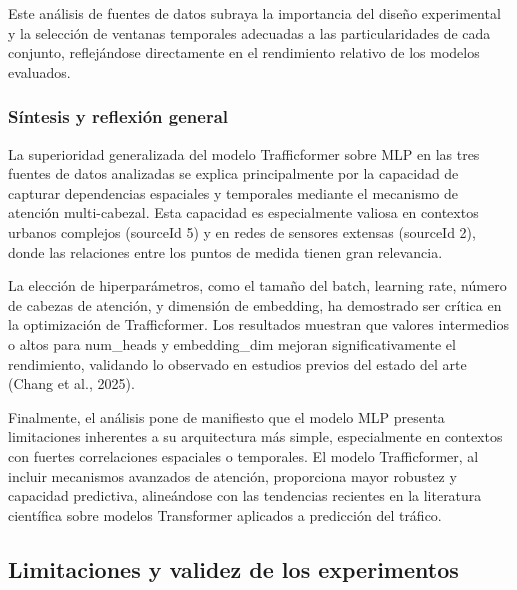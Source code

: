 Este análisis de fuentes de datos subraya la importancia del diseño experimental y la selección de ventanas temporales adecuadas a las particularidades de cada conjunto, reflejándose directamente en el rendimiento relativo de los modelos evaluados.

\subsubsection{Síntesis y reflexión general}

La superioridad generalizada del modelo Trafficformer sobre MLP en las tres fuentes de datos analizadas se explica principalmente por la capacidad de capturar dependencias espaciales y temporales mediante el mecanismo de atención multi-cabezal. Esta capacidad es especialmente valiosa en contextos urbanos complejos (sourceId 5) y en redes de sensores extensas (sourceId 2), donde las relaciones entre los puntos de medida tienen gran relevancia.

La elección de hiperparámetros, como el tamaño del batch, learning rate, número de cabezas de atención, y dimensión de embedding, ha demostrado ser crítica en la optimización de Trafficformer. Los resultados muestran que valores intermedios o altos para num_heads y embedding_dim mejoran significativamente el rendimiento, validando lo observado en estudios previos del estado del arte (Chang et al., 2025).

Finalmente, el análisis pone de manifiesto que el modelo MLP presenta limitaciones inherentes a su arquitectura más simple, especialmente en contextos con fuertes correlaciones espaciales o temporales. El modelo Trafficformer, al incluir mecanismos avanzados de atención, proporciona mayor robustez y capacidad predictiva, alineándose con las tendencias recientes en la literatura científica sobre modelos Transformer aplicados a predicción del tráfico.

\subsection{Limitaciones y validez de los experimentos}
\label{sec:limitaciones_validez}

\lipsum[1-1]


